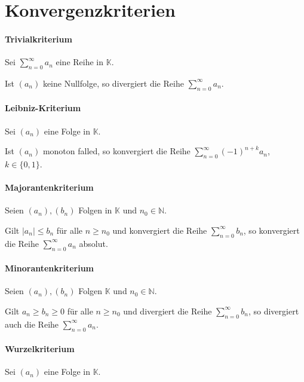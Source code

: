     \section{Konvergenzkriterien}
        \paragraph{Trivialkriterium}
            Sei $ \sum _ { n = 0 } ^ \infty a _ n $ eine Reihe in $ \mathbb{K} $.

            Ist $ (a _ n) $ keine Nullfolge, so divergiert die Reihe $ \sum _ { n = 0 } ^ \infty a _ n $.

        \paragraph{Leibniz-Kriterium}
            Sei $ (a _ n) $ eine Folge in $ \mathbb{K} $.

            Ist $ (a _ n) $ monoton falled, so konvergiert die Reihe $ \sum _ { n = 0 } ^ \infty (-1) ^ { n + k } a _ n $, $ k \in \{ 0, 1 \} $.

        \paragraph{Majorantenkriterium}
            Seien $ (a _ n), (b _ n) $ Folgen in $ \mathbb{K} $ und $ n _ 0 \in \mathbb{N} $.

            Gilt $ \lvert a _ n \rvert \leq b _ n $ für alle $ n \geq n _ 0 $ und konvergiert die Reihe $ \sum _ { n = 0 } ^ \infty b _ n $, so konvergiert die Reihe $ \sum _ { n = 0 } ^ \infty a _ n $ absolut.

        \paragraph{Minorantenkriterium}
            Seien $ (a _ n), (b _ n) $ Folgen $ \mathbb{K} $ und $ n _ 0 \in \mathbb{N} $.

            Gilt $ a _ n \geq b _ n \geq 0 $ für alle $ n \geq n _ 0 $ und divergiert die Reihe $ \sum _ { n = 0 } ^ \infty b _ n $, so divergiert auch die Reihe $ \sum _ { n = 0 } ^ \infty a _ n $.

        \paragraph{Wurzelkriterium}
            Sei $ (a _ n) $ eine Folge in $ \mathbb{K} $.


